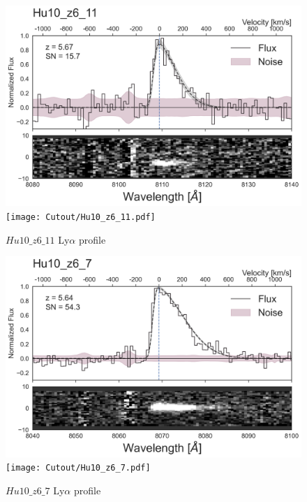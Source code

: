 \documentclass[12pt,english]{article}
\begin{document}
\clearpage
\begin{figure}
\begin{center}\includegraphics[width=12cm, trim=0.1cm 0cm 0cm -1cm]{LyaProfiles/Hu10_z6_11.png}
\texttt{[image: Cutout/Hu10\_z6\_11.pdf]}
\caption{$Hu10\_z6\_11$ Ly$\alpha$ profile}
\end{center}
\end{figure}
\clearpage
\begin{figure}
\begin{center}\includegraphics[width=12cm, trim=0.1cm 0cm 0cm -1cm]{LyaProfiles/Hu10_z6_7.png}
\texttt{[image: Cutout/Hu10\_z6\_7.pdf]}
\caption{$Hu10\_z6\_7$ Ly$\alpha$ profile}
\end{center}
\end{figure}
\clearpage
\end{document}
